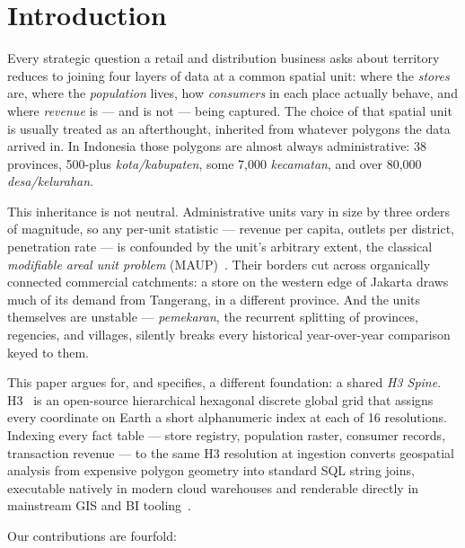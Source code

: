 \documentclass[11pt,a4paper,twocolumn]{article}
\begin{document}
\section{Introduction}
\label{sec:intro}

Every strategic question a retail and distribution business asks about
territory reduces to joining four layers of data at a common spatial unit:
where the \emph{stores} are, where the \emph{population} lives, how
\emph{consumers} in each place actually behave, and where \emph{revenue} is
--- and is not --- being captured. The choice of that spatial unit is
usually treated as an afterthought, inherited from whatever polygons the
data arrived in. In Indonesia those polygons are almost always
administrative: 38 provinces, 500-plus \emph{kota/kabupaten}, some 7{,}000
\emph{kecamatan}, and over 80{,}000 \emph{desa/kelurahan}.

This inheritance is not neutral. Administrative units vary in size by three
orders of magnitude, so any per-unit statistic --- revenue per capita,
outlets per district, penetration rate --- is confounded by the unit's
arbitrary extent, the classical \emph{modifiable areal unit problem}
(MAUP)~\cite{openshaw1984}. Their borders cut across organically connected
commercial catchments: a store on the western edge of Jakarta draws much of
its demand from Tangerang, in a different province. And the units
themselves are unstable --- \emph{pemekaran}, the recurrent splitting of
provinces, regencies, and villages, silently breaks every historical
year-over-year comparison keyed to them.

This paper argues for, and specifies, a different foundation: a shared
\emph{H3 Spine}. H3~\cite{brodsky2018} is an open-source hierarchical
hexagonal discrete global grid that assigns every coordinate on Earth a
short alphanumeric index at each of 16 resolutions. Indexing every fact
table --- store registry, population raster, consumer records, transaction
revenue --- to the same H3 resolution at ingestion converts geospatial
analysis from expensive polygon geometry into standard SQL string joins,
executable natively in modern cloud warehouses and renderable directly in
mainstream GIS and BI tooling~\cite{crawford2023, snowflakeh3}.

Our contributions are fourfold:
\end{document}
